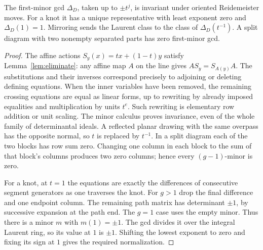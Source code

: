 \begin{theorem}
The first-minor gcd $\Delta_D$, taken up to $\pm t^j$, is invariant under oriented Reidemeister moves. For a knot it has a unique representative with least exponent zero and $\Delta_D(1)=1$. Mirroring sends the Laurent class to the class of $\Delta_D(t^{-1})$. A split diagram with two nonempty separated parts has zero first-minor gcd.
\end{theorem}
\begin{proof}
The affine actions $S_y(x)=tx+(1-t)y$ satisfy Lemma~\ref{lem:eliminate}: any affine map $A$ on the line gives $A S_y=S_{A(y)} A$. The substitutions and their inverses correspond precisely to adjoining or deleting defining equations. When the inner variables have been removed, the remaining crossing equations are equal as linear forms, up to rewriting by already imposed equalities and multiplication by units $t^e$. Such rewriting is elementary row addition or unit scaling. The minor calculus proves invariance, even of the whole family of determinantal ideals. A reflected planar drawing with the same overpass has the opposite normal, so $t$ is replaced by $t^{-1}$. In a split diagram each of the two blocks has row sum zero. Changing one column in each block to the sum of that block's columns produces two zero columns; hence every $(g-1)$-minor is zero.

For a knot, at $t=1$ the equations are exactly the differences of consecutive segment generators as one traverses the knot. For $g>1$ drop the final difference and one endpoint column. The remaining path matrix has determinant $\pm1$, by successive expansion at the path end. The $g=1$ case uses the empty minor. Thus there is a minor $m$ with $m(1)=\pm1$. The gcd divides it over the integral Laurent ring, so its value at $1$ is $\pm1$. Shifting the lowest exponent to zero and fixing its sign at $1$ gives the required normalization.
\end{proof}


